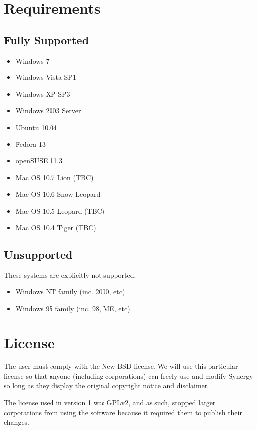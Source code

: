 \section{Requirements}

\subsection{Fully Supported}

\begin{itemize}
  \item Windows 7
  \item Windows Vista SP1
  \item Windows XP SP3
  \item Windows 2003 Server
  \item Ubuntu 10.04
  \item Fedora 13
  \item openSUSE 11.3
  \item Mac OS 10.7 Lion (TBC)
  \item Mac OS 10.6 Snow Leopard
  \item Mac OS 10.5 Leopard (TBC)
  \item Mac OS 10.4 Tiger (TBC)
\end{itemize}

\subsection{Unsupported}

These systems are explicitly not supported.

\begin{itemize}
  \item Windows NT family (inc. 2000, etc)
  \item Windows 95 family (inc. 98, ME, etc)
\end{itemize}

\section{License}

The user must comply with the New BSD license. We will use this particular 
license so that anyone (including corporations) can freely use and modify 
Synergy so long as they display the original copyright notice and disclaimer.

The license used in version 1 was GPLv2, and as such, stopped larger 
corporations from using the software because it required them to publish
their changes.
